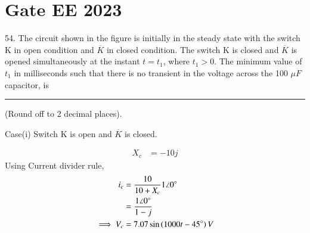 \documentclass[journal,12pt,twocolumn]{IEEEtran}
\begin{document}


\vspace{3cm}

\title{}
\author{EE23BTECH11054 -  Sai Krishna Shanigarapu$^{*}$
}
\maketitle
\newpage
\bigskip


\section*{Gate EE 2023}
54. \hspace{2pt}The circuit shown in the figure is initially in the steady state with the switch K in open condition and $\overline{K}$ in closed condition. The switch K is closed and $\overline{K}$ is opened simultaneously at the instant $t = t_1$, where $t_1 > 0$. The minimum value of $t_1$ in milliseconds such that there is no transient in the voltage across the 100 $\mu F$ capacitor, is \rule{1cm}{0.15mm} (Round off to 2 decimal places).

\begin{figure}[h!]
  \centering
  \resizebox{0.8\columnwidth}{!}{}
\end{figure}

\solution

Case(i) Switch K is open and $\overline{K}$ is closed.
\begin{figure}[h!]
  \centering
  \resizebox{0.50\columnwidth}{!}{}
\end{figure}

\begin{align}
    X_c &= -10j
\end{align}
Using Current divider rule,
\begin{align}
    i_c &= \frac{10}{10 + X_c} 1 \angle 0^\circ\\
    &= \frac{1\angle 0^\circ}{1-j}\\
    \implies V_c &= 7.07\sin \left(1000t - 45^\circ\right)V
\end{align}

%    
\end{document}
